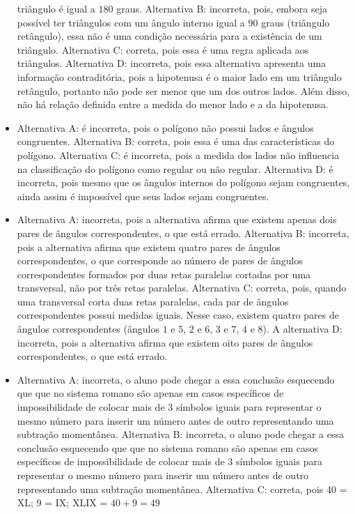 \begin{itemize}
triângulo é igual a $180$ graus.
Alternativa B: incorreta, pois, embora seja possível ter triângulos com
um ângulo interno igual a $90$ graus (triângulo retângulo), essa não é uma
condição necessária para a existência de um triângulo.
Alternativa C: correta, pois essa é uma regra aplicada aos triângulos.
Alternativa D: incorreta, pois essa alternativa apresenta uma informação
contraditória, pois a hipotenusa é o maior lado em um triângulo
retângulo, portanto não pode ser menor que um dos outros lados. Além
disso, não há relação definida entre a medida do menor lado e a da
hipotenusa.
\item Alternativa A: é incorreta, pois o polígono não possui lados e ângulos
congruentes. Alternativa B: correta, pois essa é uma das características
do polígono. Alternativa C: é incorreta, pois a medida dos lados não
influencia na classificação do polígono como regular ou não regular.
Alternativa D: é incorreta, pois mesmo que os ângulos internos do
polígono sejam congruentes, ainda assim é impossível que seus lados
sejam congruentes.
\item Alternativa A: incorreta, pois a alternativa afirma que existem apenas
dois pares de ângulos correspondentes, o que está errado. Alternativa B:
incorreta, pois a alternativa afirma que existem quatro pares de ângulos
correspondentes, o que corresponde ao número de pares de ângulos
correspondentes formados por duas retas paralelas cortadas por uma
transversal, não por três retas paralelas. Alternativa C: correta, pois,
quando uma transversal corta duas retas paralelas, cada par de ângulos
correspondentes possui medidas iguais. Nesse caso, existem quatro pares
de ângulos correspondentes (ângulos $1$ e $5$, $2$ e $6$, $3$ e $7$, $4$ e $8$). A
alternativa D: incorreta, pois a alternativa afirma que existem oito
pares de ângulos correspondentes, o que está errado.
\item Alternativa A: incorreta, o aluno pode chegar a essa conclusão
esquecendo que que no sistema romano são apenas em casos específicos de
impossibilidade de colocar mais de $3$ símbolos iguais para representar o
mesmo número para inserir um número antes de outro representando uma
subtração momentânea.
Alternativa B: incorreta, o aluno pode chegar a essa conclusão
esquecendo que que no sistema romano são apenas em casos específicos de
impossibilidade de colocar mais de $3$ símbolos iguais para representar o
mesmo número para inserir um número antes de outro representando uma
subtração momentânea.
Alternativa C: correta, pois 40 = XL; 9 = IX; XLIX = $40 + 9 = 49$

\end{itemize}
